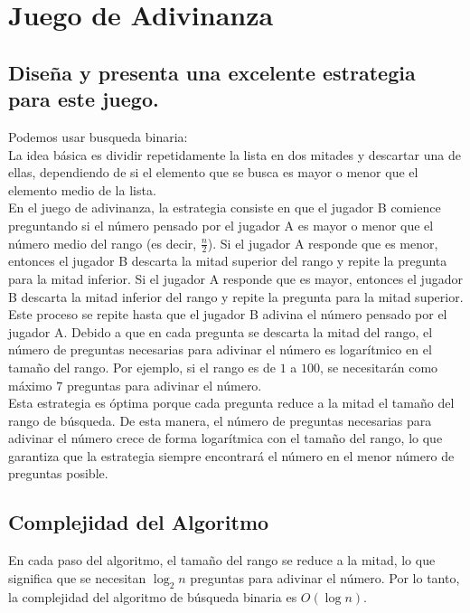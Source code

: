 \section{Juego de Adivinanza}

\subsection{Diseña y presenta una excelente estrategia para este juego.}

Podemos usar busqueda binaria:\\

La idea básica es dividir repetidamente la lista en dos mitades y descartar una de ellas, dependiendo de si el elemento que se busca es mayor o menor que el elemento medio de la lista.\\

En el juego de adivinanza, la estrategia consiste en que el jugador B comience preguntando si el número pensado por el jugador A es mayor o menor que el número medio del rango (es decir, $\frac{n}{2}$). Si el jugador A responde que es menor, entonces el jugador B descarta la mitad superior del rango y repite la pregunta para la mitad inferior. Si el jugador A responde que es mayor, entonces el jugador B descarta la mitad inferior del rango y repite la pregunta para la mitad superior.\\

Este proceso se repite hasta que el jugador B adivina el número pensado por el jugador A. Debido a que en cada pregunta se descarta la mitad del rango, el número de preguntas necesarias para adivinar el número es logarítmico en el tamaño del rango. Por ejemplo, si el rango es de $1$ a $100$, se necesitarán como máximo $7$ preguntas para adivinar el número.\\

Esta estrategia es óptima porque cada pregunta reduce a la mitad el tamaño del rango de búsqueda. De esta manera, el número de preguntas necesarias para adivinar el número crece de forma logarítmica con el tamaño del rango, lo que garantiza que la estrategia siempre encontrará el número en el menor número de preguntas posible.

\subsection{Complejidad del Algoritmo}

En cada paso del algoritmo, el tamaño del rango se reduce a la mitad, lo que significa que se necesitan $\log_2 n$ preguntas para adivinar el número. Por lo tanto, la complejidad del algoritmo de búsqueda binaria es $O(\log n)$.

